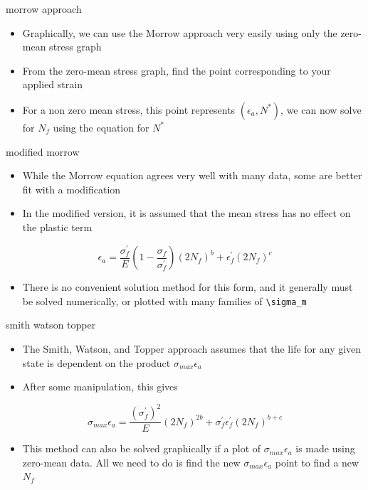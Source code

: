 \documentclass[
  letterpaper,
  ignorenonframetext,
  aspectratio=43,
  handout,
  12pt]{beamer}
\providecommand{\tightlist}{%
  \setlength{\itemsep}{0pt}\setlength{\parskip}{0pt}}
\providecommand{\tightlist}{%
\setlength{\itemsep}{0pt}\setlength{\parskip}{0pt}}
\begin{document}
\begin{frame}{morrow approach}
\protect\hypertarget{morrow-approach-2}{}
\begin{itemize}
\tightlist
\item
  Graphically, we can use the Morrow approach very easily using only the
  zero-mean stress graph
\item
  From the zero-mean stress graph, find the point corresponding to your
  applied strain
\item
  For a non zero mean stress, this point represents
  \((\epsilon_a, N^*)\), we can now solve for \(N_f\) using the equation
  for \(N^*\)
\end{itemize}
\end{frame}

\begin{frame}[fragile]{modified morrow}
\protect\hypertarget{modified-morrow}{}
\begin{itemize}
\tightlist
\item
  While the Morrow equation agrees very well with many data, some are
  better fit with a modification
\item
  In the modified version, it is assumed that the mean stress has no
  effect on the plastic term
\end{itemize}

\[\epsilon_a = \frac{\sigma_f^\prime}{E}\left(1-\frac{\sigma_f}{\sigma_f^\prime}\right)(2N_f)^b + \epsilon_f^\prime (2N_f)^c\]

\begin{itemize}
\tightlist
\item
  There is no convenient solution method for this form, and it generally
  must be solved numerically, or plotted with many families of
  \texttt{\textbackslash{}sigma\_m}
\end{itemize}
\end{frame}

\begin{frame}{smith watson topper}
\protect\hypertarget{smith-watson-topper}{}
\begin{itemize}
\tightlist
\item
  The Smith, Watson, and Topper approach assumes that the life for any
  given state is dependent on the product \(\sigma_{max} \epsilon_a\)
\item
  After some manipulation, this gives
\end{itemize}

\[\sigma_{max} \epsilon_a = \frac{\left(\sigma_f^\prime\right)^2}{E}(2N_f)^{2b} + \sigma_f^\prime \epsilon_f^\prime (2N_f)^{b+c}\]

\begin{itemize}
\tightlist
\item
  This method can also be solved graphically if a plot of
  \(\sigma_{max}\epsilon_a\) is made using zero-mean data. All we need
  to do is find the new \(\sigma_{max}\epsilon_a\) point to find a new
  \(N_f\)
\end{itemize}
\end{frame}
\end{document}
